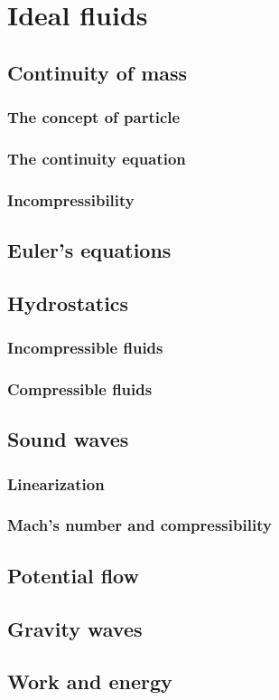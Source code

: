 \part{Ideal fluids}

\chapter{Continuity of mass}

\section{The concept of particle}

\section{The continuity equation}

\section{Incompressibility}


\chapter{Euler's equations}



\chapter{Hydrostatics}

\section{Incompressible fluids}

\section{Compressible fluids}

\chapter{Sound waves}

\section{Linearization}

\section{Mach's number and compressibility}


\chapter{Potential flow}


\chapter{Gravity waves}



\chapter{Work and energy}


